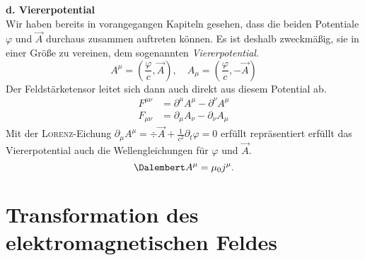 \textbf{d. Viererpotential}\\

Wir haben bereits in vorangegangen Kapiteln gesehen, dass die beiden Potentiale $\varphi$ und $\vec{A}$ durchaus zusammen auftreten können. Es ist deshalb zweckmäßig, sie in einer Größe zu vereinen, dem sogenannten \emph{Viererpotential}.
\begin{equation*}
A^\mu = \left(\frac{\varphi}{c},\vec{A}\right),\quad A_\mu = \left(\frac{\varphi}{c},-\vec{A}\right)
\end{equation*}
Der Feldstärketensor leitet sich dann auch direkt aus diesem Potential ab.
\begin{align*}
F^{\mu\nu} & = \partial^\mu A^\mu - \partial^\nu A^\mu\\
F_{\mu\nu} & = \partial_\mu A_\nu - \partial_\nu A_\mu
\end{align*}
Mit der \textsc{Lorenz}-Eichung $\partial_\mu A^\mu = \div\vec{A}+\frac{1}{c^2}\partial_t\varphi=0$ erfüllt repräsentiert erfüllt das Viererpotential auch die Wellengleichungen für $\varphi$ und $\vec{A}$.
\begin{equation*}
\Dalembert A^\mu = \mu_0j^\mu.
\end{equation*}

\section{Transformation des elektromagnetischen Feldes}

